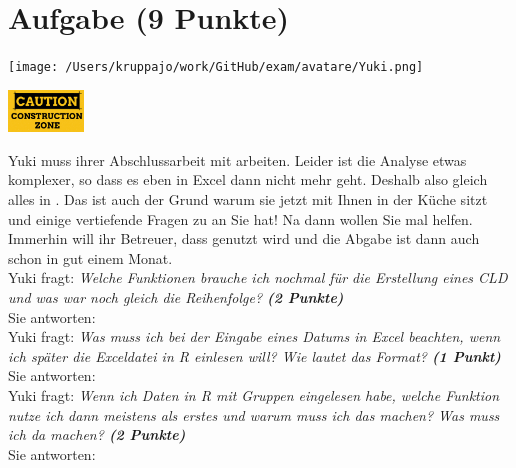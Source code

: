 \documentclass[a4paper, 9pt]{scrartcl}\usepackage[]{graphicx}\usepackage[]{xcolor}
\begin{document}
\section{Aufgabe \hfill (9 Punkte)}



 
\begin{minipage}[t]{0.5\textwidth}
\texttt{[image: /Users/kruppajo/work/GitHub/exam/avatare/Yuki.png]}
\end{minipage}
\begin{minipage}[t]{0.5\textwidth}
\hfill
\href{https://youtu.be/C9skfFRTHhI}{\includegraphics[width = 2cm]{img/caution}}
\end{minipage}
\vspace{1ex}



Yuki muss ihrer Abschlussarbeit mit \Rlogo arbeiten. Leider ist die Analyse etwas komplexer, so dass es eben in Excel dann nicht mehr geht. Deshalb also gleich alles in \Rlogo. Das ist auch der Grund warum sie jetzt mit Ihnen in der Küche sitzt und einige vertiefende Fragen zu \Rlogo an Sie hat! Na dann wollen Sie mal helfen. Immerhin will ihr Betreuer, dass \Rlogo genutzt wird und die Abgabe ist dann auch schon in gut einem Monat.\\[1Ex]

Yuki fragt: \textit{Welche Funktionen brauche ich nochmal für die Erstellung eines CLD und was war noch gleich die Reihenfolge? \textbf{(2 Punkte)}}\\[1ex]
Sie antworten:\\[2Ex]

Yuki fragt: \textit{Was muss ich bei der Eingabe eines Datums in Excel beachten, wenn ich später die Exceldatei in R einlesen will? Wie lautet das Format? \textbf{(1 Punkt)}}\\[1ex]
Sie antworten:\\[2Ex]

Yuki fragt: \textit{Wenn ich Daten in R mit Gruppen eingelesen habe, welche Funktion nutze ich dann meistens als erstes und warum muss ich das machen? Was muss ich da machen? \textbf{(2 Punkte)}}\\[1ex]
Sie antworten:\\[2Ex]
\end{document}
